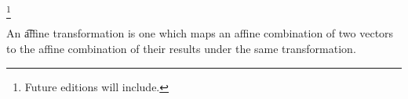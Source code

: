 
\footnote{Future editions will include.}


An \t{affine transformation} is one which maps an affine combination of two vectors to the affine combination of their results under the same transformation.

\blankpage
